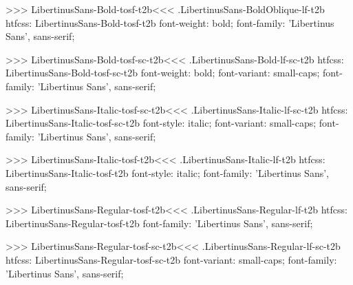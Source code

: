 {{{{{>>>
\<LibertinusSans-Bold-tosf-t2b\><<<
.LibertinusSans-BoldOblique-lf-t2b
htfcss:  LibertinusSans-Bold-tosf-t2b  font-weight: bold; font-family: 'Libertinus Sans', sans-serif;

>>>
\<LibertinusSans-Bold-tosf-sc-t2b\><<<
.LibertinusSans-Bold-lf-sc-t2b
htfcss:  LibertinusSans-Bold-tosf-sc-t2b  font-weight: bold; font-variant: small-caps; font-family: 'Libertinus Sans', sans-serif;

>>>
\<LibertinusSans-Italic-tosf-sc-t2b\><<<
.LibertinusSans-Italic-lf-sc-t2b
htfcss:  LibertinusSans-Italic-tosf-sc-t2b  font-style: italic; font-variant: small-caps; font-family: 'Libertinus Sans', sans-serif;

>>>
\<LibertinusSans-Italic-tosf-t2b\><<<
.LibertinusSans-Italic-lf-t2b
htfcss:  LibertinusSans-Italic-tosf-t2b  font-style: italic; font-family: 'Libertinus Sans', sans-serif;

>>>
\<LibertinusSans-Regular-tosf-t2b\><<<
.LibertinusSans-Regular-lf-t2b
htfcss:  LibertinusSans-Regular-tosf-t2b  font-family: 'Libertinus Sans', sans-serif;

>>>
\<LibertinusSans-Regular-tosf-sc-t2b\><<<
.LibertinusSans-Regular-lf-sc-t2b
htfcss:  LibertinusSans-Regular-tosf-sc-t2b  font-variant: small-caps; font-family: 'Libertinus Sans', sans-serif;

}}}}}
